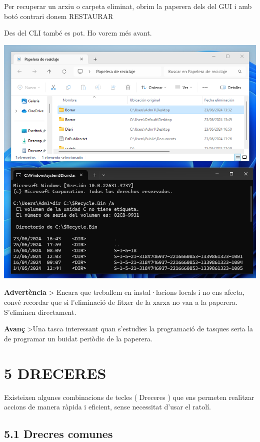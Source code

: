 \documentclass[
  a4paper,
]{article}
\begin{document}
Per recuperar un arxiu o carpeta eliminat, obrim la paperera dels del
GUI i amb botó contrari donem RESTAURAR

Des del CLI també es pot. Ho vorem més avant.

\includegraphics{png/paperera1.png}

\textbf{Advertència} \textgreater{} Encara que treballem en
instal·lacions locals i no ens afecta, convé recordar que si
l'eliminació de fitxer de la xarxa no van a la paperera. S'eliminen
directament.

\textbf{Avanç} \textgreater Una tasca interessant quan s'estudies la
programació de tasques seria la de programar un buidat periòdic de la
paperera.

\section{5 DRECERES}\label{dreceres}

Existeixen algunes combinacions de tecles ( Dreceres ) que ens permeten
realitzar accions de manera ràpida i eficient, sense necessitat d'usar
el ratolí.

\subsection{5.1 Drecres comunes}\label{drecres-comunes}
\end{document}
